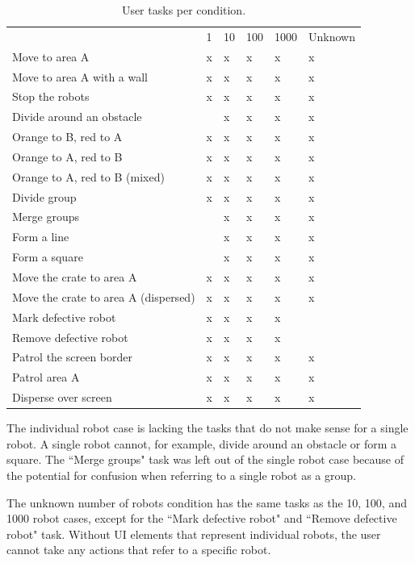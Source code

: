 \begin{table}
\begin{tabular}{l|l|l|l|l|l}
	& 1 & 10 & 100 & 1000 & Unknown \\
	Move to area A & x & x & x & x & x\\
	Move to area A with a wall & x & x & x & x & x \\
	Stop the robots & x & x & x & x & x\\
	Divide around an obstacle & & x & x & x & x \\
	Orange to B, red to A & x & x & x & x & x \\
	Orange to A, red to B & x & x & x & x & x \\
	Orange to A, red to B (mixed) & x & x & x & x & x \\
	Divide group & x & x & x & x & x \\
	Merge groups & & x & x & x & x \\
	Form a line & & x & x & x & x \\
	Form a square & & x & x & x & x \\
	Move the crate to area A & x & x & x & x & x \\
	Move the crate to area A (dispersed) & x & x & x & x & x\\
	Mark defective robot & x & x & x & x & \\
	Remove defective robot & x & x & x & x &  \\
	Patrol the screen border & x & x & x & x & x \\
	Patrol area A & x & x & x & x & x \\
	Disperse over screen & x & x & x & x & x \\
\end{tabular}
\caption{User tasks per condition.}\label{tab:tasks_per_condition}
\end{table}

The individual robot case is lacking the tasks that do not make sense for a single robot. A single robot cannot, for example, divide around an obstacle or form a square. 
The ``Merge groups" task was left out of the single robot case because of the potential for confusion when referring to a single robot as a group. 

The unknown number of robots condition has the same tasks as the 10, 100, and 1000 robot cases, except for the ``Mark defective robot" and ``Remove defective robot" task. 
Without UI elements that represent individual robots, the user cannot take any actions that refer to a specific robot. 



